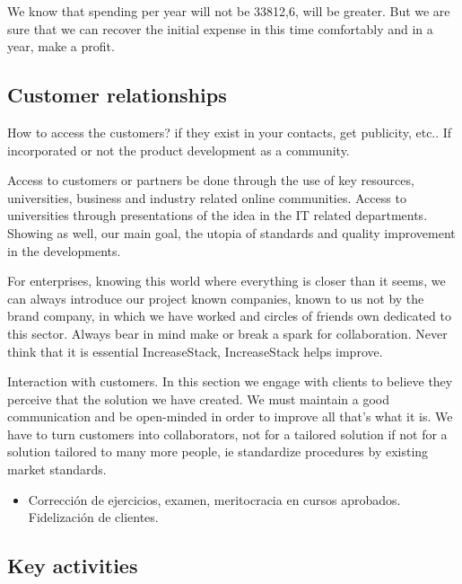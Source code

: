 \documentclass[11pt]{scrartcl}
\begin{document}
\par We know that spending per year will not be 33812,6, will be greater. But we are sure that we can recover the initial expense in this time comfortably and in a year, make a profit.

\subsection{Customer relationships}

\par How to access the customers? if they exist in your contacts, get publicity, etc.. If incorporated or not the product development as a community.

\par Access to customers or partners be done through the use of key resources, universities, business and industry related online communities.
Access to universities through presentations of the idea in the IT related departments. Showing as well, our main goal, the utopia of standards and quality improvement in the developments.

\par For enterprises, knowing this world where everything is closer than it seems, we can always introduce our project known companies, known to us not by the brand company, in which we have worked and circles of friends own dedicated to this sector. Always bear in mind make or break a spark for collaboration. Never think that it is essential IncreaseStack, IncreaseStack helps improve.

\par Interaction with customers. In this section we engage with clients to believe they perceive that the solution we have created. We must maintain a good communication and be open-minded in order to improve all that's what it is. We have to turn customers into collaborators, not for a tailored solution if not for a solution tailored to many more people, ie standardize procedures by existing market standards.

\par 
\begin{itemize}
    \item Corrección de ejercicios, examen, meritocracia en cursos aprobados. Fidelización de clientes.
\end{itemize}

\subsection{Key activities}
\end{document}
